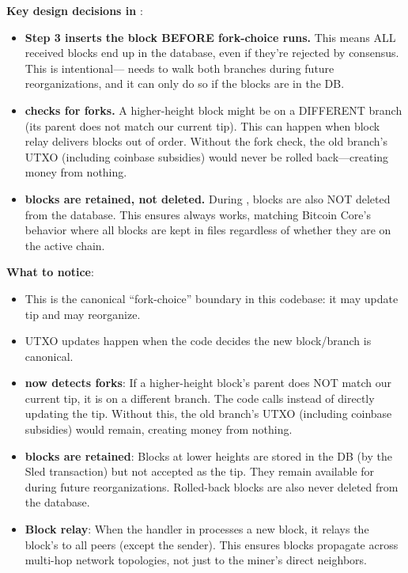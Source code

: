 \textbf{Key design decisions in }:

\begin{infobox}
\begin{itemize}
  \item \textbf{Step 3 inserts the block BEFORE fork-choice runs.} This means ALL received blocks end up in the database, even if they're rejected by consensus. This is intentional--- needs to walk both branches during future reorganizations, and it can only do so if the blocks are in the DB.

  \item \textbf{ checks for forks.} A higher-height block might be on a DIFFERENT branch (its parent does not match our current tip). This can happen when block relay delivers blocks out of order. Without the fork check, the old branch's UTXO (including coinbase subsidies) would never be rolled back---creating money from nothing.

  \item \textbf{ blocks are retained, not deleted.} During , blocks are also NOT deleted from the database. This ensures  always works, matching Bitcoin Core's behavior where all blocks are kept in  files regardless of whether they are on the active chain.
\end{itemize}
\end{infobox}

\textbf{What to notice}:
\begin{itemize}
  \item This is the canonical ``fork-choice'' boundary in this codebase: it may update tip and may reorganize.
  \item UTXO updates happen when the code decides the new block/branch is canonical.
  \item \textbf{ now detects forks}: If a higher-height block's parent does NOT match our current tip, it is on a different branch. The code calls  instead of directly updating the tip. Without this, the old branch's UTXO (including coinbase subsidies) would remain, creating money from nothing.
  \item \textbf{ blocks are retained}: Blocks at lower heights are stored in the DB (by the Sled transaction) but not accepted as the tip. They remain available for  during future reorganizations. Rolled-back blocks are also never deleted from the database.
  \item \textbf{Block relay}: When the  handler in  processes a new block, it relays the block's  to all peers (except the sender). This ensures blocks propagate across multi-hop network topologies, not just to the miner's direct neighbors.
\end{itemize}

